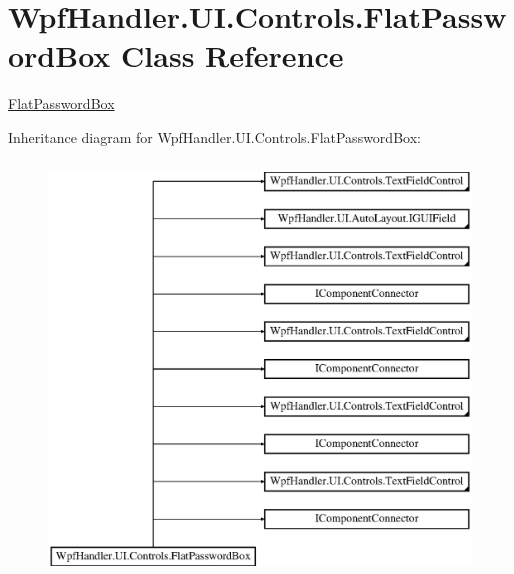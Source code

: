 \hypertarget{class_wpf_handler_1_1_u_i_1_1_controls_1_1_flat_password_box}{}\section{Wpf\+Handler.\+U\+I.\+Controls.\+Flat\+Password\+Box Class Reference}
\label{class_wpf_handler_1_1_u_i_1_1_controls_1_1_flat_password_box}


\mbox{\hyperlink{class_wpf_handler_1_1_u_i_1_1_controls_1_1_flat_password_box}{Flat\+Password\+Box}}  


Inheritance diagram for Wpf\+Handler.\+U\+I.\+Controls.\+Flat\+Password\+Box\+:\begin{figure}[H]
\begin{center}
\leavevmode
\includegraphics[height=11.000000cm]{d3/d1f/class_wpf_handler_1_1_u_i_1_1_controls_1_1_flat_password_box}
\end{center}
\end{figure}
